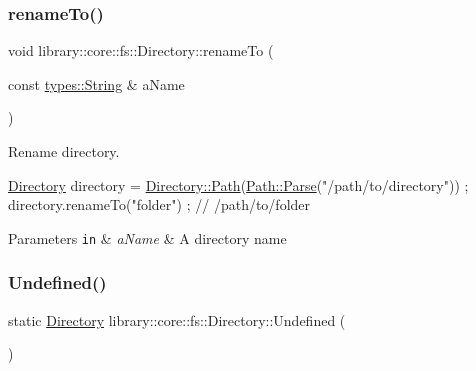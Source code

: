 \subsubsection{\texorpdfstring{rename\+To()}{renameTo()}}
{\footnotesize\ttfamily void library\+::core\+::fs\+::\+Directory\+::rename\+To (\begin{DoxyParamCaption}\item[{const \hyperlink{classlibrary_1_1core_1_1types_1_1_string}{types\+::\+String} \&}]{a\+Name }\end{DoxyParamCaption})}



Rename directory. 


\begin{DoxyCode}
\hyperlink{classlibrary_1_1core_1_1fs_1_1_directory_a3ec39f6cad19a81d520e9a1f2d8bb1f7}{Directory} directory = \hyperlink{classlibrary_1_1core_1_1fs_1_1_directory_a6d3ea04654841e62a4dbd99feb563caf}{Directory::Path}(\hyperlink{classlibrary_1_1core_1_1fs_1_1_path_a6ba644b6609507e724c217bf2020f5ae}{Path::Parse}(\textcolor{stringliteral}{"/path/to/directory"}))
       ;
directory.renameTo(\textcolor{stringliteral}{"folder"}) ; \textcolor{comment}{// /path/to/folder}
\end{DoxyCode}



\begin{DoxyParams}[1]{Parameters}
\mbox{\tt in}  & {\em a\+Name} & A directory name \\
\hline
\end{DoxyParams}
\mbox{\label{classlibrary_1_1core_1_1fs_1_1_directory_ae26fce16c37e5fed2bcc4d914a5eaa71}} 
\subsubsection{\texorpdfstring{Undefined()}{Undefined()}}
{\footnotesize\ttfamily static \hyperlink{classlibrary_1_1core_1_1fs_1_1_directory}{Directory} library\+::core\+::fs\+::\+Directory\+::\+Undefined (\begin{DoxyParamCaption}{ }\end{DoxyParamCaption})\hspace{0.3cm}{\ttfamily [static]}}



